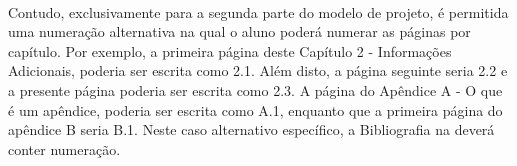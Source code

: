 \paragraph{}Contudo, exclusivamente para a segunda parte do modelo de projeto, é permitida uma numeração alternativa na qual o aluno poderá numerar as páginas por capítulo. Por exemplo, a primeira página deste Capítulo 2 - Informações Adicionais, poderia ser escrita como 2.1. Além disto, a página seguinte seria 2.2 e a presente página poderia ser escrita como 2.3. A página do Apêndice A - O que é um apêndice, poderia ser escrita como A.1, enquanto que a primeira página do apêndice B seria B.1. Neste caso alternativo específico, a Bibliografia na deverá conter numeração.

